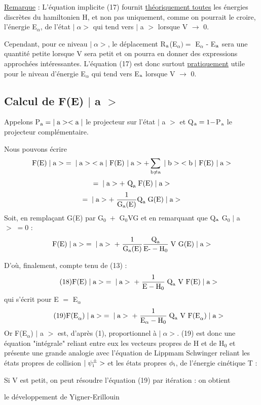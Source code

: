 \ul{Remarque} : L'équation implicite (17) fournit \ul{théoriquement toutes} les énergies
discrètes du hamiltonien H, et non pas uniquement, comme on pourrait le croire,
l'énergie E$_\alpha$, de l'état $|\;\alpha>$ qui tend vers $|$ a $>$ lorsque V $\to$ 0.

Cependant, pour ce niveau $|\;\alpha>$, le déplacement R$_{\text{a}}$(E$_\alpha) =$ E$_\alpha$ - E$_{\text{a}}$
sera une quantité petite lorsque V sera petit et on pourra en donner des
expressions approchées intéressantes. L'équation (17) est donc surtout \ul{pratiquement} utile pour le niveau d'énergie E$_\alpha$ qui tend vers E$_{\text{a}}$ lorsque V $\to$ 0.
\subsection{Calcul de F(E) $|$ a $>$}%
Appelons P$_{\text{a}}=|\;\text{a}><\text{a}\;|$ le projecteur sur l'état $|$ a $>$ et
Q$_{\text{a}}=1-$P$_{\text{a}}$ le projecteur complémentaire.

Nous pouvons écrire
\[
\text{F(E)}\;|\;\text{a}>\;=\;|\;\text{a}>\;<\text{a}\;|\text{ F(E) }|\;\text{a}>+\sum_{\text{b}\neq\text{a}}\;|\;\text{b}>\;<\text{b}\;|\text{ F(E) }|\;\text{a}>
\]
\[
=\;|\;\text{a}>+\text{ Q}_{\text{a}}\;\text{F(E)}\;|\;\text{a}>
\]
\[
=\;|\;\text{a}>+\;\frac{1}{\text{G}_{\text{a}}\text{(E)}}\text{Q}_{\text{a}}\;\text{G(E)}\;|\;\text{a}>
\]
Soit, en remplaçant G(E) par G$_0\;+$ G$_0$VG  et en remarquant que Q$_{\text{a}}$ G$_0\;|$ a $>\;=0$ :
\[
\text{F(E)}\;|\;\text{a}>\;=\;|\;\text{a}>\;+\;\frac{1}{\text{G}_{\text{a}}\text{(E)}}
\frac{\text{Q}_{\text{a}}}{\text{E-}-\text{H}_0}\;\text{V G(E)}\;|\;\text{a}>
\]

D'où, finalement, compte tenu de (13) :
\[
\tag{18}\text{F(E)}\;|\;\text{a}>\;=\;|\;\text{a}>\;+\;
\frac{1}{\text{E}-\text{H}_0}\;\text{Q}_{\text{a}}\text{ V F(E)}\;|\;\text{a}>
\]
qui s'écrit pour E $=$ E$_\alpha$
\[
\tag{19}\text{F(E}_\alpha)\;|\;\text{a}>\;=\;|\;\text{a}>\;+\;
\frac{1}{\text{E}_\alpha-\text{H}_0}\;\text{Q}_{\text{a}}\text{ V F(E}_\alpha)\;|\;\text{a}>
\]
Or F(E$_\alpha$) $|$ a $>$ est, d'après (1), proportionnel à $|\;\alpha>$. (19) est donc une
équation "intégrale" reliant entre eux les vecteurs propres de H et de H$_0$ et
présente une grande analogie avec l'équation de Lippmam Schwinger reliant les
états propres de collision $|\;\psi_{\text{i}}^\pm>$ et les états propres $\phi_{\text{i}}$, de l'énergie cinétique T :


Si V est petit, on peut résoudre l'équation (19) par itération : on obtient

le développement de Yigner-Erillouin

